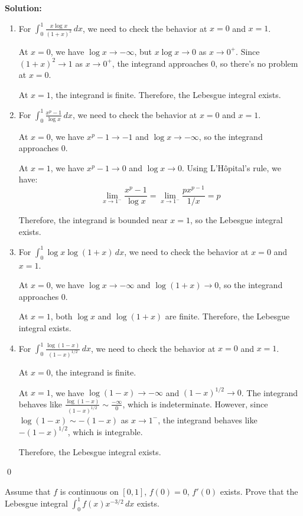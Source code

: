 \bigskip\noindent\textbf{Solution:}
\begin{enumerate}[label=(\alph*)]
\item For $\int_{0}^{1} \frac{x \log x}{(1 + x)^2} \, dx$, we need to check the behavior at $x = 0$ and $x = 1$.

At $x = 0$, we have $\log x \to -\infty$, but $x \log x \to 0$ as $x \to 0^+$. Since $(1 + x)^2 \to 1$ as $x \to 0^+$, the integrand approaches 0, so there's no problem at $x = 0$.

At $x = 1$, the integrand is finite. Therefore, the Lebesgue integral exists.

\item For $\int_{0}^{1} \frac{x^p - 1}{\log x} \, dx$, we need to check the behavior at $x = 0$ and $x = 1$.

At $x = 0$, we have $x^p - 1 \to -1$ and $\log x \to -\infty$, so the integrand approaches 0.

At $x = 1$, we have $x^p - 1 \to 0$ and $\log x \to 0$. Using L'Hôpital's rule, we have:
\[\lim_{x \to 1^-} \frac{x^p - 1}{\log x} = \lim_{x \to 1^-} \frac{px^{p-1}}{1/x} = p\]

Therefore, the integrand is bounded near $x = 1$, so the Lebesgue integral exists.

\item For $\int_{0}^{1} \log x \log (1 + x) \, dx$, we need to check the behavior at $x = 0$ and $x = 1$.

At $x = 0$, we have $\log x \to -\infty$ and $\log (1 + x) \to 0$, so the integrand approaches 0.

At $x = 1$, both $\log x$ and $\log (1 + x)$ are finite. Therefore, the Lebesgue integral exists.

\item For $\int_{0}^{1} \frac{\log (1 - x)}{(1 - x)^{1/2}} \, dx$, we need to check the behavior at $x = 0$ and $x = 1$.

At $x = 0$, the integrand is finite.

At $x = 1$, we have $\log (1 - x) \to -\infty$ and $(1 - x)^{1/2} \to 0$. The integrand behaves like $\frac{\log (1 - x)}{(1 - x)^{1/2}} \sim \frac{-\infty}{0}$, which is indeterminate. However, since $\log (1 - x) \sim -(1 - x)$ as $x \to 1^-$, the integrand behaves like $-(1 - x)^{1/2}$, which is integrable.

Therefore, the Lebesgue integral exists.
\end{enumerate}\qed


\begin{problembox}
\begin{problemstatement}
Assume that $f$ is continuous on $[0, 1]$, $f(0) = 0$, $f'(0)$ exists. Prove that the Lebesgue integral $\int_{0}^{1} f(x)x^{-3/2} \, dx$ exists.
\end{problemstatement}
\end{problembox}

